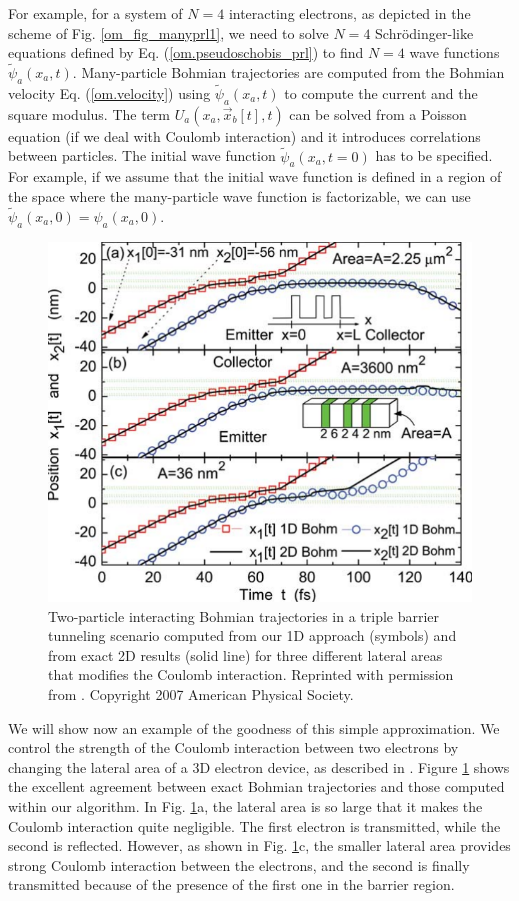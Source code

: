 \documentclass[onecolumn,nofootinbib, secnumarabic, amsmath, nobibnotes,12pt,aps,pra]{revtex4-1}
\newcommand{\fref}[1]{Fig. \ref{#1}}
\newcommand{\eref}[1]{Eq. (\ref{#1})}
\newcommand{\Fref}[1]{Figure \ref{#1}}
\begin{document}
For example, for a system of $N = 4$ interacting electrons, as
depicted in the scheme  of \fref{om_fig_manyprl1}, we need to solve
$N = 4$ Schr\"odinger-like  equations defined by  \eref{om.pseudoschobis_prl} to find $N =
4$ wave functions $\tilde{\psi}_a(x_a,t)$. Many-particle Bohmian
trajectories are computed from the Bohmian velocity
\eref{om.velocity} using $\tilde{\psi}_a(x_a,t)$ to compute the
current and the square modulus. The term \textit{$U_{a}(x_{a},\vec
x_{b}[t],t)$} can be solved from a Poisson equation (if we deal with
Coulomb interaction) and it introduces correlations between
particles. The initial wave function $\tilde{\psi}_a(x_a,t = 0)$ has
to be specified. For example, if we assume that the initial wave
function is defined in a region of the space where the many-particle
wave function is factorizable, we can use $\tilde{\psi}_a(x_a,0) =
{\psi}_a(x_a,0)$.

\begin{figure}
\includegraphics{ch1-05.pdf}
\caption{Two-particle interacting Bohmian trajectories in a triple barrier tunneling scenario
computed from our 1D approach (symbols) and from exact 2D results
(solid line) for three different lateral areas that modifies the
Coulomb interaction. Reprinted with permission from
\cite{om.oriolsprl}. Copyright 2007 American Physical Society.}
\label{om_fig_prl1}
\end{figure}

We will show now an example of the goodness of this simple
approximation. We control the strength of the Coulomb interaction
between two electrons by changing the lateral area of a 3D electron
device, as described in \cite{om.oriolsprl}. \Fref{om_fig_prl1}
shows the excellent agreement between exact Bohmian trajectories and
those computed within our algorithm. In \fref{om_fig_prl1}a, the
lateral area is so large that it makes the Coulomb interaction quite
negligible. The first electron is transmitted, while the second is
reflected. However, as shown in \fref{om_fig_prl1}c, the smaller lateral area
provides strong Coulomb interaction between the electrons, and the
second is finally transmitted because of the presence of the first
one in the barrier region.
\end{document}
